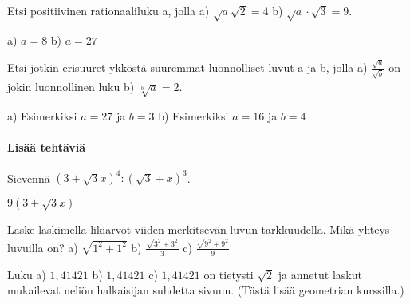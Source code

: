 \begin{tehtavasivu}
\begin{tehtava}
\begin{vastaus}

\begin{alakohdat}
\end{alakohdat}
\end{vastaus}
\end{tehtava}

\begin{tehtava} Etsi positiivinen rationaaliluku a, jolla
a) $\sqrt{a} \sqrt{2} = 4$  \quad b)   $ \sqrt{a}\cdot{\sqrt{3}} =9 $.   \quad 
\begin{vastaus}
a) $a=8$ \quad b) $a=27$ \quad 
\end{vastaus}
\end{tehtava}


\begin{tehtava} Etsi jotkin erisuuret ykköstä suuremmat luonnolliset luvut a ja b, jolla 
a) $\frac{\sqrt{a}}{\sqrt{b}}$ on jokin luonnollinen luku  \quad b) $\sqrt[b]{a}=2$.   
\begin{vastaus}
a) Esimerkiksi $a=27$ \quad ja \quad $b=3$  \quad b) Esimerkiksi $a=16$ \quad ja \quad $b=4$ 
\end{vastaus}
\end{tehtava}



\paragraph*{Lisää tehtäviä}

\begin{tehtava}
Sievennä $(3+\sqrt{3}x)^4:(\sqrt{3}+x)^3$.
\begin{vastaus}
$9(3 + \sqrt{3}x)$
\end{vastaus}
\end{tehtava}

\begin{tehtava} Laske laskimella likiarvot viiden merkitsevän luvun tarkkuudella. Mikä yhteys luvuilla on?
a) $ \sqrt{1^2+1^2}$ \quad b)  $ \frac {\sqrt{3^2+3^2}}{3}$    \quad c)  $ \frac {\sqrt{9^2+9^2}}{9}$  \quad 
\begin{vastaus}
Luku a) $1,41421$ \quad b) $1,41421$ \quad c) $1,41421$ on tietysti $\sqrt{2}$ ja annetut laskut mukailevat neliön halkaisijan suhdetta sivuun. (Tästä lisää geometrian kurssilla.) %
\end{vastaus}
\end{tehtava}




\end{tehtavasivu}
